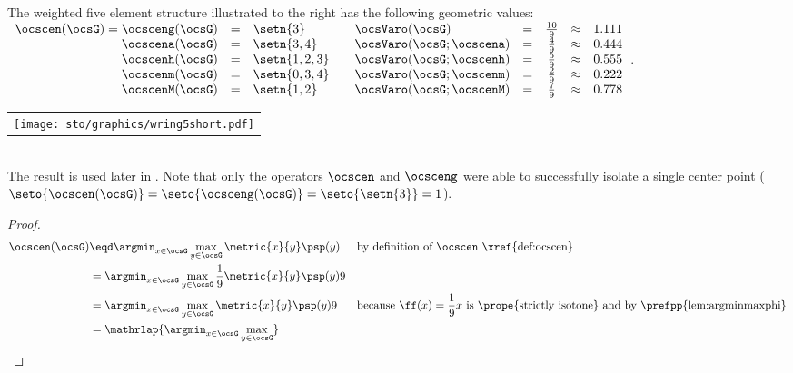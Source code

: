 \begin{tabstr}{0.75}
\begin{minipage}{\tw-65mm}%
\begin{example}%
\label{ex:wring5short}
The weighted five element structure illustrated to the right has the following geometric values:
\\\indentx$\begin{array}{rcl@{\qquad} lcccl}
    \ocscen(\ocsG)=\ocsceng(\ocsG) &=&\setn{3}      & \ocsVaro(\ocsG)          &=& \frac{10}{9} &\approx& 1.111 \\
    \ocscena(\ocsG)                &=&\setn{3,4}    & \ocsVaro(\ocsG;\ocscena) &=& \frac{ 4}{9} &\approx& 0.444  \\
    \ocscenh(\ocsG)                &=&\setn{1,2,3}  & \ocsVaro(\ocsG;\ocscenh) &=& \frac{ 5}{9} &\approx& 0.555  \\
    \ocscenm(\ocsG)                &=&\setn{0,3,4}  & \ocsVaro(\ocsG;\ocscenm) &=& \frac{ 2}{9} &\approx& 0.222  \\
    \ocscenM(\ocsG)                &=&\setn{1,2}    & \ocsVaro(\ocsG;\ocscenM) &=& \frac{7}{9}  &\approx& 0.778
  \end{array}$.
\end{example}
\end{minipage}\hfill%
\begin{tabular}{c}
  \gsize%
  {\texttt{[image: sto/graphics/wring5short.pdf]}}%
\end{tabular}
\\
The  result is used later in .
Note that only the operators $\ocscen$ and $\ocsceng$ were able to successfully isolate a single center point
($\seto{\ocscen(\ocsG)}=\seto{\ocsceng(\ocsG)}=\seto{\setn{3}}=1$).
\\
\begin{proof}
  \begin{align*}
      \ocscen(\ocsG)
        &\eqd \argmin_{x\in\ocsG}\max_{y\in\ocsG}\metric{x}{y}\psp(y)
        &&\text{by definition of $\ocscen$ \xref{def:ocscen}}
      \\&= \argmin_{x\in\ocsG}\max_{y\in\ocsG}\frac{1}{9}\metric{x}{y}\psp(y)9
      \\&= \argmin_{x\in\ocsG}\max_{y\in\ocsG}\metric{x}{y}\psp(y)9
        &&\text{because $\ff(x)=\frac{1}{9}x$ is \prope{strictly isotone} and by \prefpp{lem:argminmaxphi}}
      \\&=\mathrlap{\argmin_{x\in\ocsG}\max_{y\in\ocsG}
}
\end{align*}
\end{proof}
\end{tabstr}
